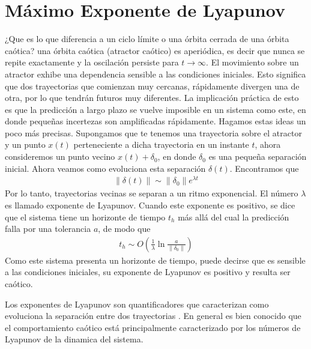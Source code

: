\section{Máximo Exponente de Lyapunov}
\label{sec:MLE}

¿Que es lo que diferencia a un ciclo límite o una órbita cerrada de una órbita caótica? una órbita caótica (atractor caótico) es aperiódica, es decir que nunca se repite exactamente y la oscilación persiste para $t \to \infty$.
El movimiento sobre un atractor exhibe una dependencia sensible a las condiciones iniciales.
Esto significa que dos trayectorias que comienzan muy cercanas, rápidamente divergen una de otra, por lo que tendrán futuros muy diferentes.
La implicación práctica de esto es que la predicción a largo plazo se vuelve imposible en un sistema como este, en donde pequeñas incertezas son amplificadas rápidamente.
Hagamos estas ideas un poco más precisas.
Supongamos que te tenemos una trayectoria sobre el atractor y un punto $x(t)$ perteneciente a dicha trayectoria en un instante $t$, ahora consideremos un punto vecino $x(t) + \delta_0$, en donde $\delta_0$ es una pequeña separación inicial.
Ahora veamos como evoluciona esta separación $\delta(t)$.
Encontramos que
%
\begin{eqnarray}
\lVert \delta(t) \rVert \sim \lVert \delta_0 \rVert e^{\lambda t}
\end{eqnarray}
%
Por lo tanto, trayectorias vecinas se separan a un ritmo exponencial.
El número $\lambda$ es llamado exponente de Lyapunov.
Cuando este exponente es positivo, se dice que el sistema tiene un horizonte de tiempo $t_h$ más allá del cual la predicción falla por una tolerancia $a$, de modo que
%
\begin{eqnarray}
t_h \sim O ( \frac{1}{\lambda} \ln \frac{a}{\lVert \delta_0 \rVert})
\end{eqnarray}
%
Como este sistema presenta un horizonte de tiempo, puede decirse que es sensible a las condiciones iniciales, su exponente de Lyapunov es positivo y resulta ser caótico.

Los exponentes de Lyapunov son quantificadores que caracterizan como evoluciona la separación entre dos trayectorias \cite{Sprott2003}.
En general es bien conocido que el comportamiento caótico está principalmente caracterizado por los números de Lyapunov de la dinamica del sistema.


